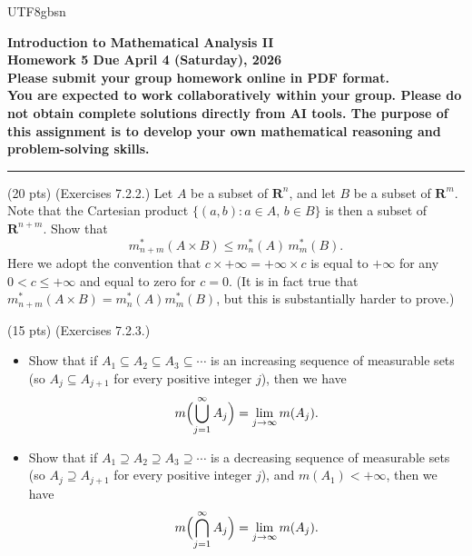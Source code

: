 \documentclass[addpoints]{exam}
\theoremstyle{definition}
\begin{document}
\begin{CJK*}{UTF8}{gbsn}
\begin{center}
    {\Large{\bf Introduction to Mathematical Analysis II\\
    Homework 5  Due  April 4 (Saturday), 2026\\
    Please submit your group homework online in PDF format.\\
You are expected to work collaboratively within your group. 
Please do not obtain complete solutions directly from AI tools. 
The purpose of this assignment is to develop your own mathematical reasoning and problem-solving skills. %
  }} \\ 
    \large
\end{center}

\noindent\rule{16.2cm}{0.4pt}


\begin{questions}


\question  (20 pts)  (Exercises 7.2.2.)
Let $A$ be a subset of $\mathbf{R}^n$, and let $B$ be a subset of $\mathbf{R}^m$.
Note that the Cartesian product $\{(a,b): a\in A,\, b\in B\}$ is then a subset of
$\mathbf{R}^{n+m}$. Show that
$$
m^*_{n+m}(A\times B)\le m^*_n(A)\,m^*_m(B).
$$
Here we adopt the convention that $c\times +\infty=+\infty\times c$ is equal to $+\infty$
for any $0<c\le +\infty$ and equal to zero for $c=0$.
(It is in fact true that $m^*_{n+m}(A\times B)=m^*_n(A)m^*_m(B)$, but this is
substantially harder to prove.)

\begin{solution}
\end{solution}

\question (15 pts) (Exercises 7.2.3.)


\begin{itemize}
\item[(a)] Show that if $A_1\subseteq A_2\subseteq A_3\subseteq\cdots$ is an increasing sequence
of measurable sets (so $A_j\subseteq A_{j+1}$ for every positive integer $j$), then we have
$$
m\Bigl(\bigcup_{j=1}^\infty A_j\Bigr)=\lim_{j\to\infty} m(A_j).
$$
\item[(b)] Show that if $A_1\supseteq A_2\supseteq A_3\supseteq\cdots$ is a decreasing sequence
of measurable sets (so $A_j\supseteq A_{j+1}$ for every positive integer $j$), and $m(A_1)<+\infty$,
then we have
$$
m\Bigl(\bigcap_{j=1}^\infty A_j\Bigr)=\lim_{j\to\infty} m(A_j).
$$
\end{itemize}


\end{questions}
\end{CJK*}
\end{document}
